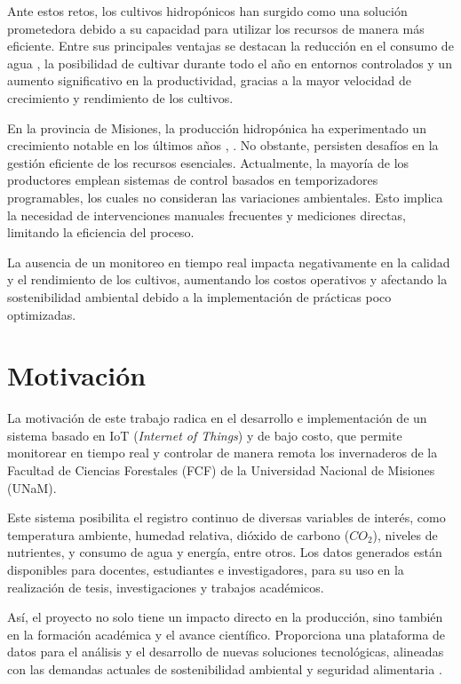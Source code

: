 Ante estos retos, los cultivos hidropónicos han surgido como una solución
prometedora debido a su capacidad para utilizar los recursos de manera más
eficiente. Entre sus principales ventajas se destacan la reducción en el
consumo de agua \cite{EficienciaAgua2014}, la posibilidad de cultivar durante
todo el año en entornos controlados y un aumento significativo en la
productividad, gracias a la mayor velocidad de crecimiento y rendimiento de los
cultivos.

En la provincia de Misiones, la producción hidropónica ha experimentado un
crecimiento notable en los últimos años \cite{HorticulturaMisiones2024},
\cite{HidroponiaMisiones2024}. No obstante, persisten desafíos en la gestión
eficiente de los recursos esenciales. Actualmente, la mayoría de los
productores emplean sistemas de control basados en temporizadores programables,
los cuales no consideran las variaciones ambientales. Esto implica la necesidad
de intervenciones manuales frecuentes y mediciones directas, limitando la
eficiencia del proceso.

La ausencia de un monitoreo en tiempo real impacta negativamente en la calidad
y el rendimiento de los cultivos, aumentando los costos operativos y afectando
la sostenibilidad ambiental debido a la implementación de prácticas poco
optimizadas.


\section{Motivación}

La motivación de este trabajo radica en el desarrollo e implementación de un
sistema basado en IoT (\textit{Internet of Things}) y de bajo costo, que
permite monitorear en tiempo real y controlar de manera remota los invernaderos
de la Facultad de Ciencias Forestales (FCF) de la Universidad Nacional de
Misiones (UNaM).

Este sistema posibilita el registro continuo de diversas variables de interés,
como temperatura ambiente, humedad relativa, dióxido de carbono ($CO_2$),
niveles de nutrientes, y consumo de agua y energía, entre otros. Los datos
generados están disponibles para docentes, estudiantes e investigadores, para
su uso en la realización de tesis, investigaciones y trabajos académicos.

Así, el proyecto no solo tiene un impacto directo en la producción, sino
también en la formación académica y el avance científico. Proporciona una
plataforma de datos para el análisis y el desarrollo de nuevas soluciones
tecnológicas, alineadas con las demandas actuales de sostenibilidad ambiental y
seguridad alimentaria \cite{seguridadAlimentariaGaribaldi2018}.

